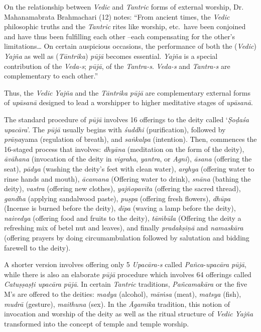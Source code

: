On the relationship between \emph{Vedic} and \emph{Tantric} forms of external worship, Dr. Mahanamabrata Brahmachari (12) notes: ``From ancient times, the \emph{Vedic} philosophic truths and the \emph{Tantric} rites like worship, etc.\ have been conjoined and have thus been fulfilling each other --each compensating for the other's limitations\ldots{} On certain auspicious occasions, the performance of both the (\emph{Vedic}) \emph{Yajña} as well as (\emph{Tāntrika}) \emph{pūjā} becomes essential. \emph{Yajña} is a special contribution of the \emph{Veda-s}; \emph{pūjā}, of the \emph{Tantra-s}. \emph{Veda-s} and \emph{Tantra-s} are complementary to each other.''

Thus, the \emph{Vedic} \emph{Yajña} and the \emph{Tāntrika} \emph{pūjā} are complementary external forms of \emph{upāsanā} designed to lead a worshipper to higher meditative stages of \emph{upāsanā}.

The standard procedure of \emph{pūjā} involves 16 offerings to the deity called `\emph{Ṣoḍaśa} \emph{upacāra}'. The \emph{pūjā} usually begins with \emph{śuddhi} (purification), followed by \emph{prāṇa}yama (regulation of breath), and \emph{saṅkalpa} (intention). Then, commences the 16-staged process that involves: \emph{dhyāna} (meditation on the form of the deity), \emph{āvāhana} (invocation of the deity in \emph{vigraha}, \emph{yantra}, or \emph{Agni}), \emph{āsana} (offering the seat), \emph{pādya} (washing the deity's feet with clean water), \emph{arghya} (offering water to rinse hands and mouth), \emph{ācamana} (Offering water to drink), \emph{snāna} (bathing the deity), \emph{vastra} (offering new clothes), \emph{yajñopavīta} (offering the sacred thread), \emph{gandha} (applying sandalwood paste), \emph{puṣpa} (offering fresh flowers), \emph{dhūpa} (Incense is burned before the deity), \emph{dīpa} (waving a lamp before the deity), \emph{naivedya} (offering food and fruits to the deity), \emph{tāṁbūla} (Offering the deity a refreshing mix of betel nut and leaves), and finally \emph{pradakṣiṇā} and \emph{namaskāra} (offering prayers by doing circumambulation followed by salutation and bidding farewell to the deity).

A shorter version involves offering only 5 \emph{Upacāra-s} called \emph{Pañca}-\emph{upacāra} \emph{pūjā}, while there is also an elaborate \emph{pūjā} procedure which involves 64 offerings called \emph{Catuṣṣaṣṭi upacāra} \emph{pūjā}. In certain \emph{Tantric} traditions, \emph{Pañcamakāra} or the five M's are offered to the deities: \emph{madya} (alcohol), \emph{māṁsa} (meat), \emph{matsya} (fish), \emph{mudrā} (gesture), \emph{maithuna} (sex). In the \emph{Āgamika} tradition, this notion of invocation and worship of the deity as well as the ritual structure of \emph{Vedic} \emph{Yajña} transformed into the concept of temple and temple worship.
\vskip 2pt

